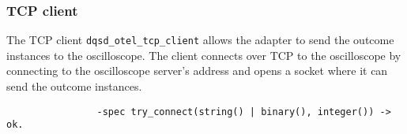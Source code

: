         \subsubsection{TCP client}
            The TCP client \texttt{dqsd\_otel\_tcp\_client} allows the adapter to send the outcome instances to the oscilloscope.
            The client connects over TCP to the oscilloscope by connecting to the oscilloscope server's address and opens a socket where it can send the outcome instances.
            \begin{verbatim}
                -spec try_connect(string() | binary(), integer()) -> ok.
            \end{verbatim}
